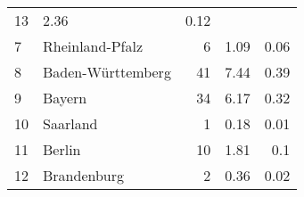 \begin{longtable}{lXrrr}
       \num{13} &
       \num[round-mode=places,round-precision=2]{2.36} &
         \num[round-mode=places,round-precision=2]{0.12} \\

     7 &
     \multicolumn{1}{X}{ Rheinland-Pfalz   } &


       \num{6} &
       \num[round-mode=places,round-precision=2]{1.09} &
         \num[round-mode=places,round-precision=2]{0.06} \\

     8 &
     \multicolumn{1}{X}{ Baden-Württemberg   } &


       \num{41} &
       \num[round-mode=places,round-precision=2]{7.44} &
         \num[round-mode=places,round-precision=2]{0.39} \\

     9 &
     \multicolumn{1}{X}{ Bayern   } &


       \num{34} &
       \num[round-mode=places,round-precision=2]{6.17} &
         \num[round-mode=places,round-precision=2]{0.32} \\

     10 &
     \multicolumn{1}{X}{ Saarland   } &


       \num{1} &
       \num[round-mode=places,round-precision=2]{0.18} &
         \num[round-mode=places,round-precision=2]{0.01} \\

     11 &
     \multicolumn{1}{X}{ Berlin   } &


       \num{10} &
       \num[round-mode=places,round-precision=2]{1.81} &
         \num[round-mode=places,round-precision=2]{0.1} \\

     12 &
     \multicolumn{1}{X}{ Brandenburg   } &


       \num{2} &
       \num[round-mode=places,round-precision=2]{0.36} &
         \num[round-mode=places,round-precision=2]{0.02} \\


\end{longtable}
